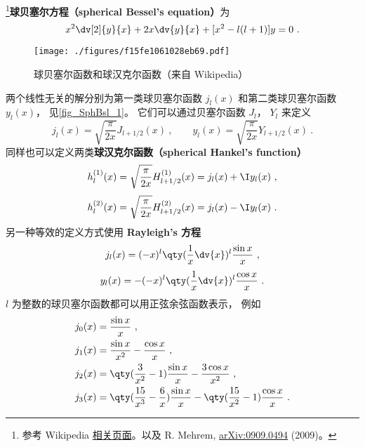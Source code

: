 

\footnote{参考 Wikipedia \href{https://en.wikipedia.org/wiki/Bessel_function}{相关页面}。以及 R. Mehrem, \href{https://arxiv.org/abs/0909.0494}{arXiv:0909.0494} (2009)。}\textbf{球贝塞尔方程（spherical Bessel's equation）}为
\begin{equation}
x^2 \dv[2]{y}{x} + 2x \dv{y}{x} + [x^2 - l(l + 1)]y = 0~.
\end{equation}
\begin{figure}[ht]
\centering
\texttt{[image: ./figures/f15fe1061028eb69.pdf]}
\caption{球贝塞尔函数和球汉克尔函数（来自 Wikipedia）} \label{fig_SphBsl_1}
\end{figure}
两个线性无关的解分别为第一类球贝塞尔函数 $j_l(x)$ 和第二类球贝塞尔函数 $y_l(x)$， 见\autoref{fig_SphBsl_1}。 它们可以通过贝塞尔函数 $J_l$， $Y_l$ 来定义
\begin{equation}
j_l(x) = \sqrt{\frac{\pi}{2x}} J_{l+1/2}(x)~,
\qquad
y_l(x) = \sqrt{\frac{\pi}{2x}} Y_{l+1/2}(x)~.
\end{equation}
同样也可以定义两类\textbf{球汉克尔函数（spherical Hankel's function）}
\begin{equation}
h_l^{(1)}(x) = \sqrt {\frac{\pi }{2x}} H_{l+1/2}^{(1)}(x) = j_l(x) + \I y_l(x)~,
\end{equation}
\begin{equation}
h_l^{(2)}(x) = \sqrt{\frac{\pi }{2x}} H_{l+1/2}^{(2)}(x) = j_l(x) - \I y_l(x)~.
\end{equation}
另一种等效的定义方式使用 \textbf{Rayleigh's 方程}
\begin{equation}
j_l(x) = (-x)^l \qty(\frac{1}{x} \dv{x})^l \frac{\sin x}{x}~,
\end{equation}
\begin{equation}
y_l(x) = -(-x)^l \qty(\frac{1}{x} \dv{x})^l \frac{\cos x}{x}~.
\end{equation}
$l$ 为整数的球贝塞尔函数都可以用正弦余弦函数表示， 例如
\begin{align}
&j_0(x) = \frac{\sin x}{x}~,\\
&j_1(x) = \frac{\sin x}{x^2} - \frac{\cos x}{x}~,\\
&j_2(x) = \qty(\frac{3}{x^2} - 1) \frac{\sin x}{x} - \frac{3\cos x}{x^2}~,\\
&j_3(x) = \qty(\frac{15}{x^3} - \frac{6}{x})\frac{\sin x}{x} - \qty(\frac{15}{x^2}-1)\frac{\cos x}{x}~.
\end{align}
